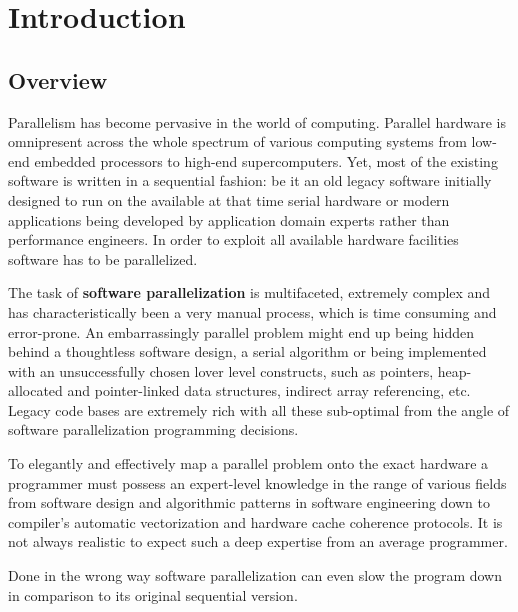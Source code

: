 \chapter{Introduction}
\label{introduction}

\section{Overview}
\label{introduction_overview}


\quad Parallelism has become pervasive in the world of computing. Parallel hardware is omnipresent across the whole spectrum of various computing systems from low-end embedded processors to high-end supercomputers. Yet, most of the existing software is written in a sequential fashion: be it an old legacy software initially designed to run on the available at that time serial hardware or modern applications being developed by application domain experts rather than performance engineers. In order to exploit all available hardware facilities software has to be parallelized.



\quad The task of \textbf{software parallelization} is multifaceted, extremely complex and has characteristically been a very manual process, which is time consuming and error-prone. An embarrassingly parallel problem might end up being hidden behind a thoughtless software design, a serial algorithm or being implemented with an unsuccessfully chosen lover level constructs, such as pointers, heap-allocated and pointer-linked data structures, indirect array referencing, etc. Legacy code bases are extremely rich with all these sub-optimal from the angle of software parallelization programming decisions.

To elegantly and effectively map a parallel problem onto the exact hardware a programmer must possess an expert-level knowledge in the range of various fields from software design and algorithmic patterns in software engineering down to compiler's automatic vectorization and hardware cache coherence protocols. It is not always realistic to expect such a deep expertise from an average programmer.

Done in the wrong way software parallelization can even slow the program down in comparison to its original sequential version. 

